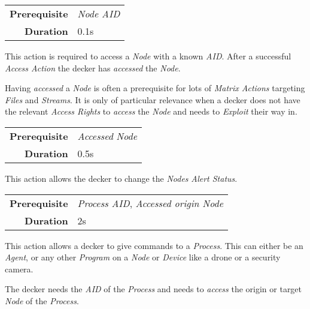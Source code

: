\begin{tabular}{rl}
    \textbf{Prerequisite} & \emph{Node AID} \\
    \textbf{Duration}     & 0.1s            \\
\end{tabular}

\hfill

This action is required to access a \emph{Node} with a known \emph{AID}. After a
successful \emph{Access Action} the decker has \emph{accessed} the \emph{Node}.

Having \emph{accessed} a \emph{Node} is often a prerequisite for lots of
\emph{Matrix Actions} targeting \emph{Files} and \emph{Streams}. It is only of
particular relevance when a decker does not have the relevant \emph{Access Rights}
to \emph{access} the \emph{Node} and needs to \emph{Exploit} their way in.

\label{par:change alert status}


\begin{tabular}{rl}
    \textbf{Prerequisite} & \emph{Accessed} \emph{Node} \\
    \textbf{Duration}     & 0.5s                        \\
\end{tabular}

\hfill

This action allows the decker to change the \emph{Nodes} \emph{Alert Status}.

\label{par:command (matrix)}

\begin{tabular}{rl}
    \textbf{Prerequisite} & \emph{Process AID}, \emph{Accessed origin Node} \\
    \textbf{Duration}     & 2s                                              \\
\end{tabular}

\hfill

This action allows a decker to give commands to a \emph{Process}. This can either
be an \emph{Agent}, or any other \emph{Program} on a \emph{Node} or \emph{Device}
like a drone or a security camera.

The decker needs the \emph{AID} of the \emph{Process} and needs to \emph{access}
the origin or target \emph{Node} of the \emph{Process}.

\label{par:create file}

